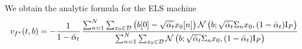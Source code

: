 \documentclass[a4paper,10pt]{article}
\begin{document}
We obtain the analytic formula for the ELS machine 
\begin{equation*}
    v_{f^*}(t,b) = -\frac{1}{1-\bar\alpha_t}\,\frac{\sum_{n=1}^{N}\sum_{x_0  \in \mathcal{D}} \left(b[0] -  \sqrt{\bar{\alpha_t}}x_0[n]\right) \mathcal{N}\left( {b; \sqrt{\bar \alpha_t} \Sigma_n x_0, (1-\bar\alpha_t) \mathrm{I}_P} \right)}{\sum_{n=1}^{N}\sum_{x_0  \in \mathcal{D}} \mathcal{N}\left( {b; \sqrt{\bar \alpha_t} \Sigma_n x_0, (1-\bar\alpha_t) \mathrm{I}_P} \right)}
\end{equation*}






\end{document}

